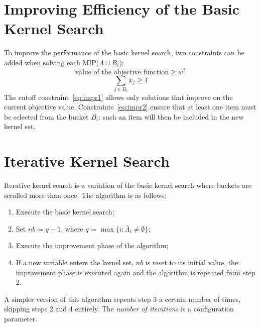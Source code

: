 \section{Improving Efficiency of the Basic Kernel Search}\label{sec:improving-efficiency}
To improve the performance of the basic kernel search, two constraints can be added
when solving each MIP(\(\Lambda \cup B_{i}\)):
\begin{equation}
    \label{eq:impr1}
    \text{value of the objective function} \geq w^{*}
\end{equation}
\begin{equation}
    \label{eq:impr2}
    \sum_{j \in B_{i}} x_{j} \geq 1
\end{equation}
The cutoff constraint~\eqref{eq:impr1} allows only solutions that improve on the current
objective value.
Constraints~\eqref{eq:impr2} ensure that at least one item must be selected from the bucket \(B_{i}\):
such an item will then be included in the new kernel set.


\section{Iterative Kernel Search}\label{sec:iter}
Iterative kernel search is a variation of the basic kernel search where buckets are scrolled more than once.
The algorithm is as follows:
\begin{enumerate}
    \item Execute the basic kernel search;
    \item Set \(nb \coloneqq q-1\), where \(q \coloneqq \max\{i:\bar{\Lambda}_{i} \neq \emptyset\}\);
    \item Execute the improvement phase of the algorithm;
    \item If a new variable enters the kernel set, \(nb\) is reset to its initial value,
    the improvement phase is executed again and the algorithm is repeated from step 2.
\end{enumerate}

A simpler version of this algorithm repeats step 3 a certain number of times,
skipping steps 2 and 4 entirely.
The \textit{number of iterations} is a configuration parameter.